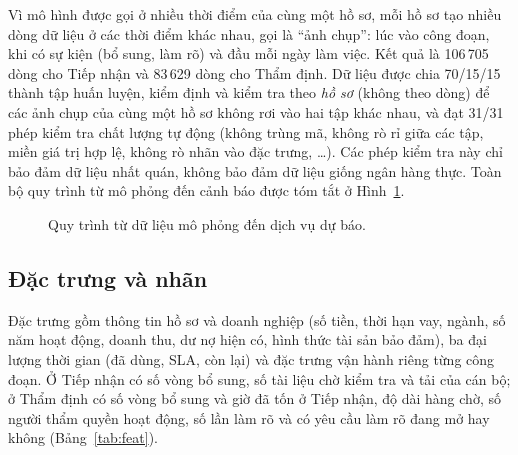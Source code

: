 \documentclass[journal]{IEEEtran}
\begin{document}
Vì mô hình được gọi ở nhiều thời điểm của cùng một hồ sơ, mỗi hồ sơ tạo nhiều dòng dữ liệu ở các thời điểm khác nhau, gọi là ``ảnh chụp'': lúc vào công đoạn, khi có sự kiện (bổ sung, làm rõ) và đầu mỗi ngày làm việc. Kết quả là 106\,705 dòng cho Tiếp nhận và 83\,629 dòng cho Thẩm định. Dữ liệu được chia 70/15/15 thành tập huấn luyện, kiểm định và kiểm tra theo \emph{hồ sơ} (không theo dòng) để các ảnh chụp của cùng một hồ sơ không rơi vào hai tập khác nhau, và đạt 31/31 phép kiểm tra chất lượng tự động (không trùng mã, không rò rỉ giữa các tập, miền giá trị hợp lệ, không rò nhãn vào đặc trưng, \ldots). Các phép kiểm tra này chỉ bảo đảm dữ liệu nhất quán, không bảo đảm dữ liệu giống ngân hàng thực. Toàn bộ quy trình từ mô phỏng đến cảnh báo được tóm tắt ở Hình~\ref{fig:pipe}.

\begin{figure}[t]
\centering
{}
\caption{Quy trình từ dữ liệu mô phỏng đến dịch vụ dự báo.}
\label{fig:pipe}
\end{figure}

\subsection{Đặc trưng và nhãn}
Đặc trưng gồm thông tin hồ sơ và doanh nghiệp (số tiền, thời hạn vay, ngành, số năm hoạt động, doanh thu, dư nợ hiện có, hình thức tài sản bảo đảm), ba đại lượng thời gian (đã dùng, SLA, còn lại) và đặc trưng vận hành riêng từng công đoạn. Ở Tiếp nhận có số vòng bổ sung, số tài liệu chờ kiểm tra và tải của cán bộ; ở Thẩm định có số vòng bổ sung và giờ đã tốn ở Tiếp nhận, độ dài hàng chờ, số người thẩm quyền hoạt động, số lần làm rõ và có yêu cầu làm rõ đang mở hay không (Bảng~\ref{tab:feat}).
\end{document}
